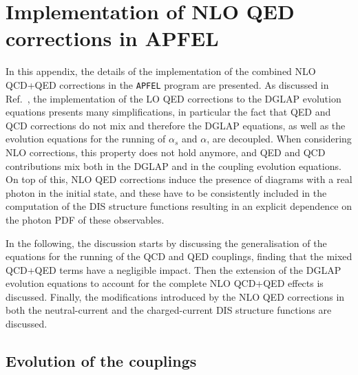 \appendix
\section{Implementation of NLO QED corrections in APFEL}
\label{sec:appendixAPFEL}

In this appendix, the details of the implementation of the combined
NLO QCD+QED corrections in the {\tt APFEL} program are presented. As
discussed in Ref.~\cite{Bertone:2013vaa}, the implementation of the LO
QED corrections to the DGLAP evolution equations presents many
simplifications, in particular the fact that QED and QCD corrections
do not mix and therefore the DGLAP equations, as well as the evolution
equations for the running of $\alpha_s$ and $\alpha$, are decoupled.
When considering NLO corrections, this property does not hold anymore,
and QED and QCD contributions mix both in the DGLAP and in the
coupling evolution equations. On top of this, NLO QED corrections
induce the presence of diagrams with a real photon in the initial
state, and these have to be consistently included in the computation
of the DIS structure functions resulting in an explicit dependence on
the photon PDF of these observables.

In the following, the discussion starts by discussing the
generalisation of the equations for the running of the QCD and QED
couplings, finding that the mixed QCD+QED terms have a negligible
impact. Then the extension of the DGLAP evolution equations to account
for the complete NLO QCD+QED effects is discussed. Finally, the
modifications introduced by the NLO QED corrections in both the
neutral-current and the charged-current DIS structure functions are
discussed.

\subsection{Evolution of the couplings}

